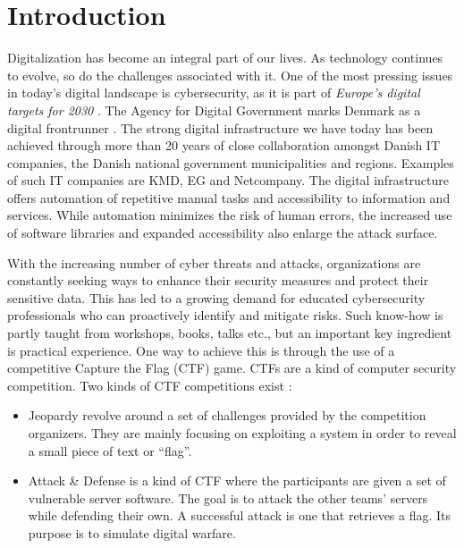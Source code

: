 
{ \hypersetup{hidelinks} \tableofcontents {}}

\newpage
{}
\setcounter{page}{1}

\chapter{Introduction}
Digitalization has become an integral part of our lives. As technology continues to evolve, so do the challenges associated with it. One of the most pressing issues in today's digital landscape is cybersecurity, as it is part of \textit{Europe's digital targets for 2030} \Parencite{europe_digital_decade}. The Agency for Digital Government marks Denmark as a digital frontrunner \Parencite{danish_digital_journey}. The strong digital infrastructure we have today has been achieved through more than 20 years of close collaboration amongst Danish IT companies, the Danish national government municipalities and regions. Examples of such IT companies are KMD, EG and Netcompany. The digital infrastructure offers automation of repetitive manual tasks and accessibility to information and services. While automation minimizes the risk of human errors, the increased use of software libraries and expanded accessibility also enlarge the attack surface.

With the increasing number of cyber threats and attacks, organizations are constantly seeking ways to enhance their security measures and protect their sensitive data. This has led to a growing demand for educated cybersecurity professionals who can proactively identify and mitigate risks. Such know-how is partly taught from workshops, books, talks etc., but an important key ingredient is practical experience. One way to achieve this is through the use of a competitive Capture the Flag (CTF) game. CTFs are a kind of computer security competition. Two kinds of CTF competitions exist \Parencite{ctf_overview}: 

\begin{itemize}
    \item Jeopardy revolve around a set of challenges provided by the competition organizers. They are mainly focusing on exploiting a system in order to reveal a small piece of text or ``flag''. 
    \item Attack \& Defense is a kind of CTF where the participants are given a set of vulnerable server software. The goal is to attack the other teams' servers while defending their own. A successful attack is one that retrieves a flag. Its purpose is to simulate digital warfare.
\end{itemize}

